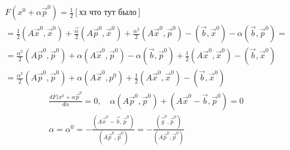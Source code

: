 \begin{gather*}
F(x^0 + \alpha \vec p^0) = \frac12 \left[ \text{хз что тут было}\right] \\
  = \frac12 (A\vec x^0, \vec x^0) + \frac{\vec\alpha}{2} (A \vec p^0, \vec x^0) +
  \frac{\alpha^2}2(A\vec x^0, \vec p^0) - (\vec b, \vec x^0) - \alpha(\vec b, \vec p^0) = \\
  = \frac{\alpha^2}{2} (A \vec p^0, \vec p^0) + \alpha (A \vec x^0, \vec p^0) -
  \alpha(\vec b, \vec p^0) + \frac12 (A\vec x^0, \vec x^0) - (\vec b, \vec x^0) \\
  = \frac{\alpha^2}{2} (A \vec p^0, \vec p^0) + \alpha (A \vec x^0, p^0) + \frac12(A\vec x^0, \vec x^0) - (\vec b, \vec x^0)
\end{gather*}
\begin{align*}
  \frac{dF(x^0 + \alpha {\vec p}^0}{d\alpha} = 0, \quad \alpha(A\vec p^0, \vec p^0) + (A \vec x^0 - \vec b, \vec p^0) = 0 \\
                      \alpha = \alpha^0 = -\frac{(A \vec x^0 - \vec b, \vec p^0)}{(A\vec p^0, \vec p^0)} = -\frac{(\vec g^0, \vec p^0)}{(A\vec p^0, \vec p^0)}
\end{align*}